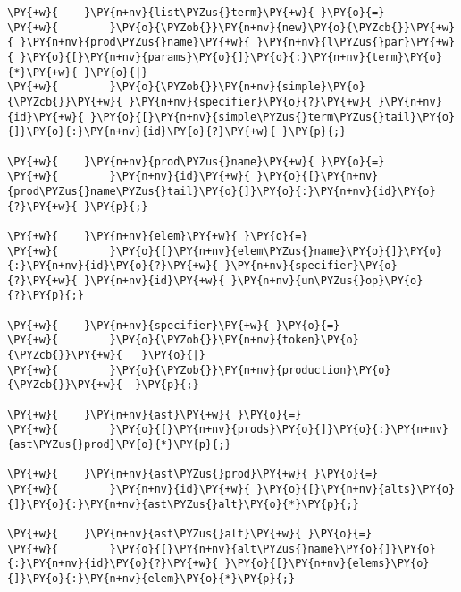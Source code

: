 \begin{Verbatim}[commandchars=\\\{\}]
\PY{+w}{    }\PY{n+nv}{list\PYZus{}term}\PY{+w}{ }\PY{o}{=}
\PY{+w}{        }\PY{o}{\PYZob{}}\PY{n+nv}{new}\PY{o}{\PYZcb{}}\PY{+w}{ }\PY{n+nv}{prod\PYZus{}name}\PY{+w}{ }\PY{n+nv}{l\PYZus{}par}\PY{+w}{ }\PY{o}{[}\PY{n+nv}{params}\PY{o}{]}\PY{o}{:}\PY{n+nv}{term}\PY{o}{*}\PY{+w}{ }\PY{o}{|}
\PY{+w}{        }\PY{o}{\PYZob{}}\PY{n+nv}{simple}\PY{o}{\PYZcb{}}\PY{+w}{ }\PY{n+nv}{specifier}\PY{o}{?}\PY{+w}{ }\PY{n+nv}{id}\PY{+w}{ }\PY{o}{[}\PY{n+nv}{simple\PYZus{}term\PYZus{}tail}\PY{o}{]}\PY{o}{:}\PY{n+nv}{id}\PY{o}{?}\PY{+w}{ }\PY{p}{;}

\PY{+w}{    }\PY{n+nv}{prod\PYZus{}name}\PY{+w}{ }\PY{o}{=}
\PY{+w}{        }\PY{n+nv}{id}\PY{+w}{ }\PY{o}{[}\PY{n+nv}{prod\PYZus{}name\PYZus{}tail}\PY{o}{]}\PY{o}{:}\PY{n+nv}{id}\PY{o}{?}\PY{+w}{ }\PY{p}{;}

\PY{+w}{    }\PY{n+nv}{elem}\PY{+w}{ }\PY{o}{=}
\PY{+w}{        }\PY{o}{[}\PY{n+nv}{elem\PYZus{}name}\PY{o}{]}\PY{o}{:}\PY{n+nv}{id}\PY{o}{?}\PY{+w}{ }\PY{n+nv}{specifier}\PY{o}{?}\PY{+w}{ }\PY{n+nv}{id}\PY{+w}{ }\PY{n+nv}{un\PYZus{}op}\PY{o}{?}\PY{p}{;}

\PY{+w}{    }\PY{n+nv}{specifier}\PY{+w}{ }\PY{o}{=}
\PY{+w}{        }\PY{o}{\PYZob{}}\PY{n+nv}{token}\PY{o}{\PYZcb{}}\PY{+w}{ 	}\PY{o}{|}
\PY{+w}{        }\PY{o}{\PYZob{}}\PY{n+nv}{production}\PY{o}{\PYZcb{}}\PY{+w}{ 	}\PY{p}{;}

\PY{+w}{    }\PY{n+nv}{ast}\PY{+w}{ }\PY{o}{=}
\PY{+w}{        }\PY{o}{[}\PY{n+nv}{prods}\PY{o}{]}\PY{o}{:}\PY{n+nv}{ast\PYZus{}prod}\PY{o}{*}\PY{p}{;}

\PY{+w}{    }\PY{n+nv}{ast\PYZus{}prod}\PY{+w}{ }\PY{o}{=}
\PY{+w}{        }\PY{n+nv}{id}\PY{+w}{ }\PY{o}{[}\PY{n+nv}{alts}\PY{o}{]}\PY{o}{:}\PY{n+nv}{ast\PYZus{}alt}\PY{o}{*}\PY{p}{;}

\PY{+w}{    }\PY{n+nv}{ast\PYZus{}alt}\PY{+w}{ }\PY{o}{=}
\PY{+w}{        }\PY{o}{[}\PY{n+nv}{alt\PYZus{}name}\PY{o}{]}\PY{o}{:}\PY{n+nv}{id}\PY{o}{?}\PY{+w}{ }\PY{o}{[}\PY{n+nv}{elems}\PY{o}{]}\PY{o}{:}\PY{n+nv}{elem}\PY{o}{*}\PY{p}{;}
\end{Verbatim}
